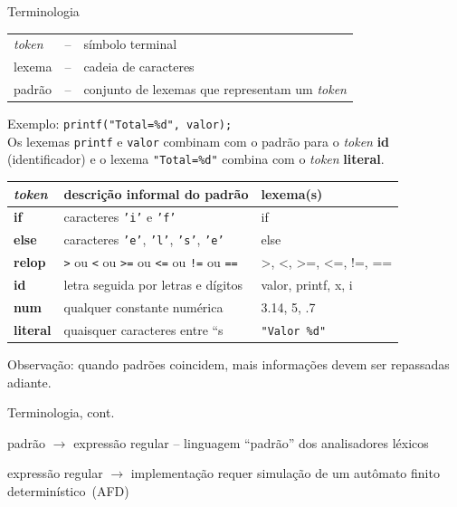 \begin{frame}{Terminologia}
  \begin{tabular}[h]{lcl}
    \alert{\it token\/}& -- & símbolo terminal\\
    lexema & -- &cadeia de caracteres \\
    padrão & -- &conjunto de lexemas que representam um {\it token\/}
  \end{tabular}\bigskip

  \pause\small
  Exemplo: {\tt printf("Total=\%d", valor);}\\
  Os lexemas {\tt printf} e {\tt valor} combinam com o padrão para
  o {\it token\/} {\bf id} (identificador) e o lexema {\tt "Total=\%d"}
  combina com o {\it token\/} {\bf literal}.\\

  \pause\bigskip
  \begingroup
  \footnotesize\center
  \begin{tabular}[h]{lll}\toprule
    {\sc\it token\/}& \sc descrição informal do padrão & \sc lexema(s)\\
    \midrule
    {\bf if} & caracteres {\tt 'i'} e {\tt 'f'} & if \\
    {\bf else} & caracteres {\tt 'e'}, {\tt 'l'}, {\tt 's'}, {\tt 'e'}  & else \\
    {\bf relop} & {\tt >} ou {\tt <} ou {\tt >=} ou {\tt <=} ou {\tt !=}
                  ou {\tt ==} & >, <, >=, <=, !=, == \\
    {\bf id} & letra seguida por letras e dígitos & valor, printf, x, i \\
    {\bf num} & qualquer constante numérica & 3.14, 5, .7 \\
    {\bf literal} & quaisquer caracteres entre ``s & {\tt "Valor \%d"} \\
    \bottomrule
  \end{tabular}
  \endgroup
  \bigskip

    \scriptsize
    Observação: quando padrões coincidem, mais informações devem
    ser repassadas adiante.
\end{frame}


\begin{frame}{Terminologia, cont.}

  \hfil padrão $\rightarrow$ \alert{expressão regular} --
  linguagem ``padrão'' dos analisadores léxicos\\\bigskip

  expressão regular $\rightarrow$ implementação requer simulação de um
  \alert{autômato finito determinístico}~(AFD)

\end{frame}

